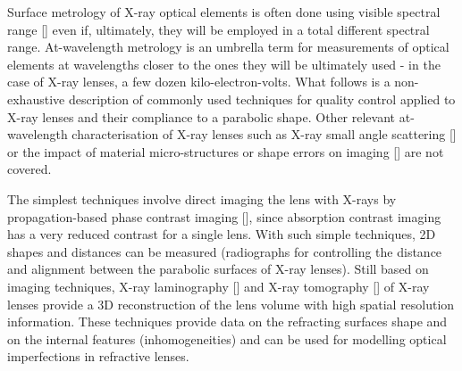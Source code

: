 \begin{refsection}
Surface metrology of X-ray optical elements is often done using visible spectral range [\cite{Alcock2016, Vivo2019}] even if, ultimately, they will be employed in a total different spectral range. At-wavelength metrology is an umbrella term for measurements of optical elements at wavelengths closer to the ones they will be ultimately used - in the case of X-ray lenses, a few dozen kilo-electron-volts. What follows is a non-exhaustive description of commonly used techniques for quality control applied to X-ray lenses and their compliance to a parabolic shape. Other relevant at-wavelength characterisation of X-ray lenses such as X-ray small angle scattering [\cite{Roth2014, Chubar2020}] or the impact of material micro-structures or shape errors on imaging [\cite{Chubar2020,Lyatun2020}] are not covered. 

The simplest techniques involve direct imaging the lens with X-rays by propagation-based phase contrast imaging [\cite{Endrizzi2018}], since absorption contrast imaging has a very reduced contrast for a single lens. With such simple techniques, 2D shapes and distances can be measured (radiographs for controlling the distance and alignment between the parabolic surfaces of X-ray lenses). Still based on imaging techniques, X-ray laminography [\cite{Helfen2011,Roth2014}] and X-ray tomography [\cite{Landis2010,Narikovich2017}] of X-ray lenses provide a 3D reconstruction of the lens volume with high spatial resolution information. These techniques provide data on the refracting surfaces shape and on the internal features (inhomogeneities) and can be used for modelling optical imperfections in refractive lenses. 



\end{refsection}
